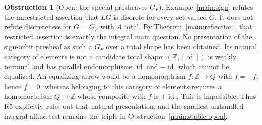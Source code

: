 \documentclass[11pt,a4paper]{article}
\theoremstyle{definition}
\newtheorem{obstruction}[theorem]{Obstruction}
\begin{document}
\begin{obstruction}[Open: the special presheaves $G_F$]\label{main:special-presheaves}
Example~\ref{main:sign} refutes the unrestricted assertion that $LG$ is
discrete for every set-valued $G$. It does not refute discreteness for
$G=G_F$ with $A$ total. By Theorem~\ref{main:reflection}, that restricted
assertion is exactly the integral main question. No presentation of the
sign-orbit presheaf as such a $G_F$ over a total shape has been obtained.
Its natural category of elements is not a candidate total shape:
$(\mathbb Z,[\operatorname{id}])$ is weakly terminal and has parallel
endomorphisms $\operatorname{id}$ and $-\operatorname{id}$ which cannot
be equalized. An equalizing arrow would be a homomorphism
$f:\mathbb Z\to Q$ with $f=-f$, hence $f=0$, whereas belonging to this
category of elements requires a homomorphism $Q\to\mathbb Z$ whose
composite with $f$ is $\pm\operatorname{id}$. This is impossible.
Thus R5 explicitly rules out that natural presentation, and the smallest
unhandled integral affine test remains the triple in
Obstruction~\ref{main:stable-open}.
\end{obstruction}
\end{document}
